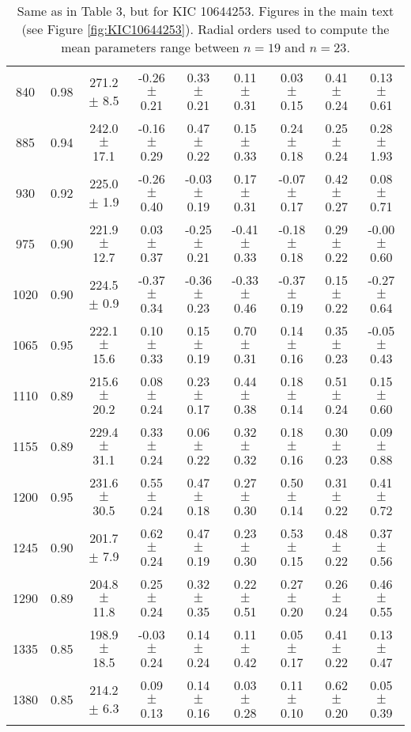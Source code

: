 \documentclass[twocolumn]{aastex61}%
\begin{document}
\begin{table}[ht]
\begin{tabular}{ccc|ccccc|c}
840 & 0.98 & 271.2 $\pm$ 8.5 & -0.26 $\pm$ 0.21 & 0.33 $\pm$ 0.21 & 0.11 $\pm$ 0.31 & 0.03 $\pm$ 0.15 & 0.41 $\pm$ 0.24 & 0.13 $\pm$ 0.61\\
885 & 0.94 & 242.0 $\pm$ 17.1 & -0.16 $\pm$ 0.29 & 0.47 $\pm$ 0.22 & 0.15 $\pm$ 0.33 & 0.24 $\pm$ 0.18 & 0.25 $\pm$ 0.24 & 0.28 $\pm$ 1.93\\
930 & 0.92 & 225.0 $\pm$ 1.9 & -0.26 $\pm$ 0.40 & -0.03 $\pm$ 0.19 & 0.17 $\pm$ 0.31 & -0.07 $\pm$ 0.17 & 0.42 $\pm$ 0.27 & 0.08 $\pm$ 0.71\\
975 & 0.90 & 221.9 $\pm$ 12.7 & 0.03 $\pm$ 0.37 & -0.25 $\pm$ 0.21 & -0.41 $\pm$ 0.33 & -0.18 $\pm$ 0.18 & 0.29 $\pm$ 0.22 & -0.00 $\pm$ 0.60\\
1020 & 0.90 & 224.5 $\pm$ 0.9 & -0.37 $\pm$ 0.34 & -0.36 $\pm$ 0.23 & -0.33 $\pm$ 0.46 & -0.37 $\pm$ 0.19 & 0.15 $\pm$ 0.22 & -0.27 $\pm$ 0.64\\
1065 & 0.95 & 222.1 $\pm$ 15.6 & 0.10 $\pm$ 0.33 & 0.15 $\pm$ 0.19 & 0.70 $\pm$ 0.31 & 0.14 $\pm$ 0.16 & 0.35 $\pm$ 0.23 & -0.05 $\pm$ 0.43\\
1110 & 0.89 & 215.6 $\pm$ 20.2 & 0.08 $\pm$ 0.24 & 0.23 $\pm$ 0.17 & 0.44 $\pm$ 0.38 & 0.18 $\pm$ 0.14 & 0.51 $\pm$ 0.24 & 0.15 $\pm$ 0.60\\
1155 & 0.89 & 229.4 $\pm$ 31.1 & 0.33 $\pm$ 0.24 & 0.06 $\pm$ 0.22 & 0.32 $\pm$ 0.32 & 0.18 $\pm$ 0.16 & 0.30 $\pm$ 0.23 & 0.09 $\pm$ 0.88\\
1200 & 0.95 & 231.6 $\pm$ 30.5 & 0.55 $\pm$ 0.24 & 0.47 $\pm$ 0.18 & 0.27 $\pm$ 0.30 & 0.50 $\pm$ 0.14 & 0.31 $\pm$ 0.22 & 0.41 $\pm$ 0.72\\
1245 & 0.90 & 201.7 $\pm$ 7.9 & 0.62 $\pm$ 0.24 & 0.47 $\pm$ 0.19 & 0.23 $\pm$ 0.30 & 0.53 $\pm$ 0.15 & 0.48 $\pm$ 0.22 & 0.37 $\pm$ 0.56\\
1290 & 0.89 & 204.8 $\pm$ 11.8 & 0.25 $\pm$ 0.24 & 0.32 $\pm$ 0.35 & 0.22 $\pm$ 0.51 & 0.27 $\pm$ 0.20 & 0.26 $\pm$ 0.24 & 0.46 $\pm$ 0.55\\
1335 & 0.85 & 198.9 $\pm$ 18.5 & -0.03 $\pm$ 0.24 & 0.14 $\pm$ 0.24 & 0.11 $\pm$ 0.42 & 0.05 $\pm$ 0.17 & 0.41 $\pm$ 0.22 & 0.13 $\pm$ 0.47\\
1380 & 0.85 & 214.2 $\pm$ 6.3 & 0.09 $\pm$ 0.13 & 0.14 $\pm$ 0.16 & 0.03 $\pm$ 0.28 & 0.11 $\pm$ 0.10 & 0.62 $\pm$ 0.20 & 0.05 $\pm$ 0.39\\
\end{tabular}
\parbox{2\hsize}{\caption{Same as in Table 3, but for KIC 10644253. Figures in the main text (see Figure \ref{fig:KIC10644253}). Radial orders used to compute the mean parameters range between $n=19$ and $n=23$.}\label{tab:10644253}}
\end{table}
\end{document}
